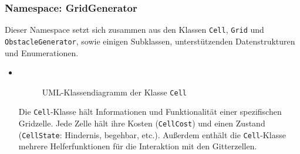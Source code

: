 \subsubsection{Namespace: GridGenerator}
\label{subsubsec:aufbau_backend_ueberblick_gridgen}
Dieser Namespace setzt sich zusammen aus den Klassen \texttt{Cell}, \texttt{Grid} und \texttt{ObstacleGenerator}, sowie einigen Subklassen, unterstützenden Datenstrukturen und Enumerationen.
\begin{itemize}
    \item {} \\
    \begin{figure}[H]
        \vspace{-0.5cm}
        \centering
        
        \caption{UML-Klassendiagramm der Klasse \texttt{Cell}}
        \label{fig:uml_cell}
    \end{figure}
    Die \texttt{Cell}-Klasse hält Informationen und Funktionalität einer spezifischen Gridzelle.
    Jede Zelle hält ihre Kosten (\texttt{CellCost}) und einen Zustand (\texttt{CellState}: Hindernis, begehbar, etc.).
    Außerdem enthält die \texttt{Cell}-Klasse mehrere Helferfunktionen für die Interaktion mit den Gitterzellen.


\end{itemize}
